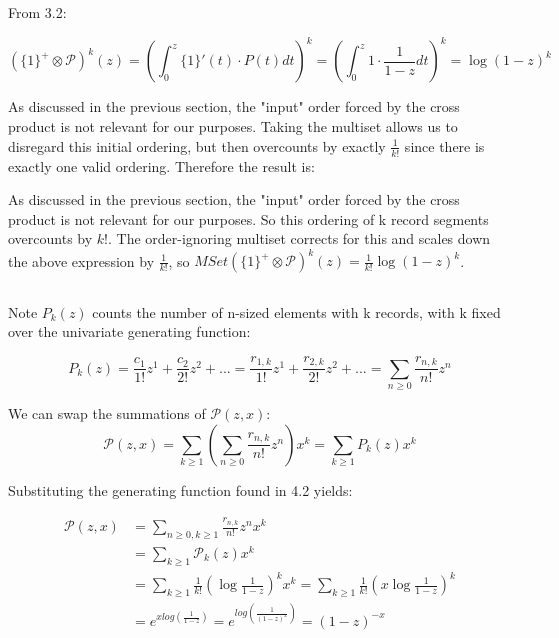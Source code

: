 \documentclass{article}
\begin{document}
\subsection{} 

From 3.2:

$$(\{1\}^+\otimes \mathcal{P})^k(z) = \left(\int_{0}^{z} \{1\}'(t) \cdot P(t) dt\right)^k = \left(\int_{0}^{z} 1 \cdot \frac{1}{1-z}  dt\right)^k = \log(1-z)^k $$ 

As discussed in the previous section, the "input" order forced by the cross product is not relevant for our purposes. Taking the multiset allows us to disregard this initial ordering, but then overcounts by exactly $\frac{1}{k!}$ since there is exactly one valid ordering. Therefore the result is:

As discussed in the previous section, the "input" order forced by the cross product is not relevant for our purposes. So this ordering of k record segments overcounts by $k!$. The order-ignoring multiset corrects for this and scales down the above expression by $\frac{1}{k!}$, so $MSet(\{1\}^+\otimes \mathcal{P})^k(z) = \frac{1}{k!}\log(1-z)^k$.

\subsection{}

Note $P_k(z)$ counts the number of n-sized elements with k records, with k fixed over the univariate generating function: 

$$P_k(z) =  \frac{c_1}{1!}z^1 + \frac{c_2}{2!}z^2 +... = \frac{r_{1,k}}{1!}z^1 + \frac{r_{2,k}}{2!}z^2 +... = \sum_{n\ge 0} \frac{r_{n,k}}{n!}z^n$$

We can swap the summations of $\mathcal{P}(z,x)$:
$$\mathcal{P}(z,x) =\sum_{k\ge 1}\left( \sum_{n\ge 0} \frac{r_{n,k}}{n!}z^n\right) x^k = \sum_{k\ge 1} P_k(z) x^k $$

Substituting the generating function found in 4.2 yields:

\begin{align*}
	\mathcal{P}(z,x)&=\sum_{n\ge 0, k\ge 1}\frac{r_{n,k}}{n!}z^nx^k\\
	&=\sum_{k\ge 1}\mathcal{P}_k(z) x^k\\
	&=\sum_{k\ge 1}\frac{1}{k!}\left(\log\frac{1}{1-z}\right)^kx^k=\sum_{k\ge 1}\frac{1}{k!}\left(x\log\frac{1}{1-z}\right)^k\\
	&=e^{xlog(\frac{1}{1-z})} = e^{log(\frac{1}{(1-z)^x})} = (1-z)^{-x}
\end{align*}
\end{document}
